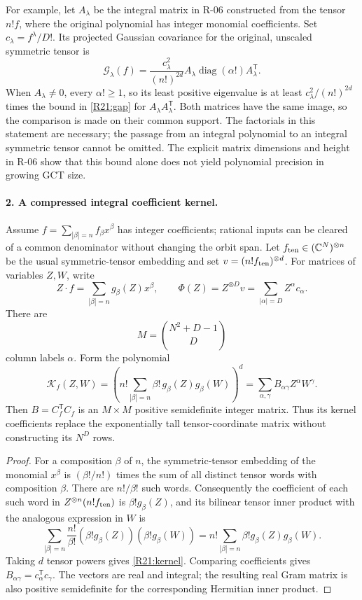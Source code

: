 For example, let $A_\lambda$ be the integral matrix in R-06 constructed
from the tensor $n!f$, where the original polynomial has integer monomial
coefficients. Set $c_\lambda=f^\lambda/D!$. Its projected Gaussian
covariance for the original, unscaled symmetric tensor is
\begin{equation}\label{R21:gaussiantransport}
 \mathcal G_\lambda(f)=
 \frac{c_\lambda^2}{(n!)^{2d}}
 A_\lambda\operatorname{diag}(\alpha!)A_\lambda^{\mathsf T}.
\end{equation}
When $A_\lambda\ne0$, every $\alpha!\geq1$, so its least positive eigenvalue is at least
$c_\lambda^2/(n!)^{2d}$ times the bound in \eqref{R21:gap} for
$A_\lambda A_\lambda^{\mathsf T}$. Both matrices have the same image,
so the comparison is made on their common support. The factorials in
this statement are necessary; the passage from an integral polynomial
to an integral symmetric tensor cannot be omitted.
The explicit matrix dimensions and height in R-06 show that this
bound alone does not yield polynomial precision in growing GCT size.

\paragraph{2. A compressed integral coefficient kernel.}
Assume $f=\sum_{|\beta|=n}f_\beta x^\beta$ has integer coefficients;
rational inputs can be cleared of a common denominator without changing
the orbit span. Let $f_{\rm ten}\in(\mathbb C^N)^{\otimes n}$ be the
usual symmetric-tensor embedding and set
$v=(n!f_{\rm ten})^{\otimes d}$.
For matrices of variables $Z,W$, write
\[
 Z\cdot f=\sum_{|\beta|=n}g_\beta(Z)x^\beta,
 \qquad
 \Phi(Z)=Z^{\otimes D}v=\sum_{|\alpha|=D}Z^\alpha c_\alpha.
\]
There are
\[
 M=\binom{N^2+D-1}{D}
\]
column labels $\alpha$. Form the polynomial
\begin{equation}\label{R21:kernel}
 \mathcal K_f(Z,W)=
 \left(n!\sum_{|\beta|=n}\beta!\,
                     g_\beta(Z)g_\beta(W)\right)^d
       =\sum_{\alpha,\gamma}B_{\alpha\gamma}Z^\alpha W^\gamma.
\end{equation}
Then $B=C_f^{\mathsf T}C_f$ is an $M\times M$ positive semidefinite
integer matrix. Thus its kernel coefficients replace the exponentially
tall tensor-coordinate matrix without constructing its $N^D$ rows.

\begin{proof}
For a composition $\beta$ of $n$, the symmetric-tensor embedding of
the monomial $x^\beta$ is
$(\beta!/n!)$ times the sum of all distinct tensor words with
composition $\beta$. There are $n!/\beta!$ such words.
Consequently the coefficient of each such word in
$Z^{\otimes n}(n!f_{\rm ten})$ is $\beta!g_\beta(Z)$, and its
bilinear tensor inner product with the analogous expression in $W$ is
\[
 \sum_{|\beta|=n}\frac{n!}{\beta!}
                 (\beta!g_\beta(Z))(\beta!g_\beta(W))
 =n!\sum_{|\beta|=n}\beta!g_\beta(Z)g_\beta(W).
\]
Taking $d$ tensor powers gives \eqref{R21:kernel}. Comparing coefficients
gives $B_{\alpha\gamma}=c_\alpha^{\mathsf T}c_\gamma$.
The vectors are real and integral; the resulting real Gram matrix is
also positive semidefinite for the corresponding Hermitian inner product.
\end{proof}

